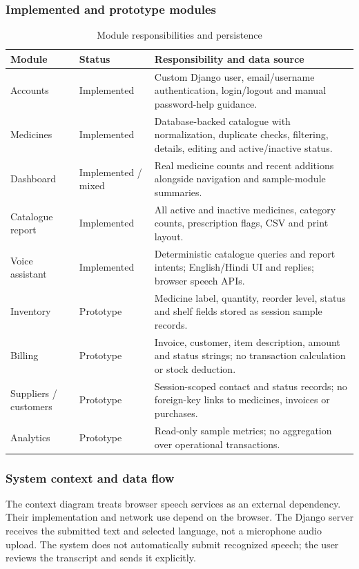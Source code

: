 \documentclass[11pt,a4paper]{article}
\begin{document}
\subsubsection{Implemented and prototype modules}
\begin{table}[H]
\centering\small
\caption{Module responsibilities and persistence}
\begin{tabularx}{\textwidth}{L{29mm}L{23mm}Y}
\toprule Module & Status & Responsibility and data source\\\midrule
Accounts & Implemented & Custom Django user, email/username authentication, login/logout and manual password-help guidance.\\
Medicines & Implemented & Database-backed catalogue with normalization, duplicate checks, filtering, details, editing and active/inactive status.\\
Dashboard & Implemented / mixed & Real medicine counts and recent additions alongside navigation and sample-module summaries.\\
Catalogue report & Implemented & All active and inactive medicines, category counts, prescription flags, CSV and print layout.\\
Voice assistant & Implemented & Deterministic catalogue queries and report intents; English/Hindi UI and replies; browser speech APIs.\\
Inventory & Prototype & Medicine label, quantity, reorder level, status and shelf fields stored as session sample records.\\
Billing & Prototype & Invoice, customer, item description, amount and status strings; no transaction calculation or stock deduction.\\
Suppliers / customers & Prototype & Session-scoped contact and status records; no foreign-key links to medicines, invoices or purchases.\\
Analytics & Prototype & Read-only sample metrics; no aggregation over operational transactions.\\
\bottomrule
\end{tabularx}
\end{table}

\subsubsection{System context and data flow}
The context diagram treats browser speech services as an external dependency. Their implementation and network use depend on the browser. The Django server receives the submitted text and selected language, not a microphone audio upload. The system does not automatically submit recognized speech; the user reviews the transcript and sends it explicitly.
\end{document}
